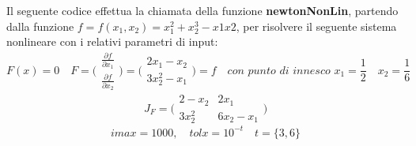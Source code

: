 Il seguente codice effettua la chiamata della funzione \textbf{newtonNonLin}, partendo dalla funzione $f = f(x_1,x_2)=x_1^2+x_2^3-x1x2$, per risolvere il seguente sistema nonlineare con i relativi parametri di input:
	\[
	F(x)=0 \quad
	F=\Bigg(\begin{matrix}
		\frac{\partial f}{\partial x_1} \\
		\frac{\partial f}{\partial x_2} 
	\end{matrix}\Bigg) = 
	\Bigg(\begin{matrix}
		2x_1-x_2 \\
		3x_2^2-x_1
	\end{matrix}\Bigg)=f \quad
	\textit{con punto di innesco } x_1=\frac{1}{2} \quad x_2=\frac{1}{6}
	\]
	\[
	J_F=\Bigg(\begin{matrix}
		2-x_2 & 2x_1 \\
		3x_2^2 & 6x_2-x_1 
	\end{matrix}\Bigg)
	\]
	\[
	imax=1000, \quad 
	tolx=10^{-t} \quad t=\{3,6\}
	\]


